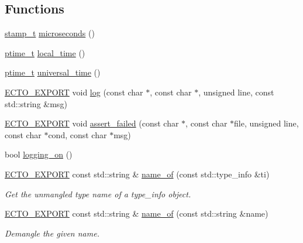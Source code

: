 \subsection*{\-Functions}
\begin{DoxyCompactItemize}
\item 
\hyperlink{namespaceecto_a96ba8fa498cc4b8e2a0217a9e236b50d}{stamp\-\_\-t} \hyperlink{namespaceecto_af5e1929b12d596f7cc45a3fe7c76c5ed}{microseconds} ()
\item 
\hyperlink{namespaceecto_a5bbe8fb0da047cb18d92eb9dfb469652}{ptime\-\_\-t} \hyperlink{namespaceecto_a67829007171203782a69bde851cb1dc6}{local\-\_\-time} ()
\item 
\hyperlink{namespaceecto_a5bbe8fb0da047cb18d92eb9dfb469652}{ptime\-\_\-t} \hyperlink{namespaceecto_ad48a07c99914e7c96702bcce4baf6bc6}{universal\-\_\-time} ()
\item 
\hyperlink{util_8hpp_ab55b7868679cda60fc162580957fb98c}{\-E\-C\-T\-O\-\_\-\-E\-X\-P\-O\-R\-T} void \hyperlink{namespaceecto_a3870bebbdf6a0d01f28424e402be2834}{log} (const char $\ast$, const char $\ast$, unsigned line, const std\-::string \&msg)
\item 
\hyperlink{util_8hpp_ab55b7868679cda60fc162580957fb98c}{\-E\-C\-T\-O\-\_\-\-E\-X\-P\-O\-R\-T} void \hyperlink{namespaceecto_af79493e380ac31e886186e2ba1a1b809}{assert\-\_\-failed} (const char $\ast$, const char $\ast$file, unsigned line, const char $\ast$cond, const char $\ast$msg)
\item 
bool \hyperlink{namespaceecto_a34c1f436c47dc08392c8248632cde6f0}{logging\-\_\-on} ()
\item 
\hyperlink{util_8hpp_ab55b7868679cda60fc162580957fb98c}{\-E\-C\-T\-O\-\_\-\-E\-X\-P\-O\-R\-T} const std\-::string \& \hyperlink{namespaceecto_a980294f61090496ef65bc6b201f38944}{name\-\_\-of} (const std\-::type\-\_\-info \&ti)
\begin{DoxyCompactList}\small\item\em \-Get the unmangled type name of a type\-\_\-info object. \end{DoxyCompactList}\item 
\hyperlink{util_8hpp_ab55b7868679cda60fc162580957fb98c}{\-E\-C\-T\-O\-\_\-\-E\-X\-P\-O\-R\-T} const std\-::string \& \hyperlink{namespaceecto_ae8640f8758655b241efbd681cef5727f}{name\-\_\-of} (const std\-::string \&name)
\begin{DoxyCompactList}\small\item\em \-Demangle the given name. \end{DoxyCompactList}\item 

\end{DoxyCompactItemize}
